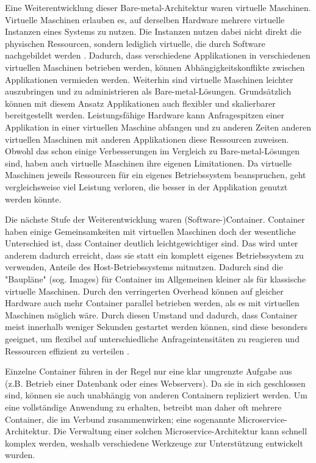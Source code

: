 \documentclass[11pt,a4paper]{article}
\begin{document}
Eine Weiterentwicklung dieser Bare-metal-Architektur waren virtuelle Maschinen. Virtuelle Maschinen erlauben es, auf derselben Hardware mehrere virtuelle Instanzen eines
Systems zu nutzen. Die Instanzen nutzen dabei nicht direkt die physischen Ressourcen, sondern lediglich virtuelle, die durch Software nachgebildet werden \cite{kofler2021docker}.
Dadurch, dass verschiedene Applikationen in verschiedenen virtuellen Maschinen betrieben werden, können Abhängigkeitskonflikte zwischen Applikationen
vermieden werden. Weiterhin sind virtuelle Maschinen leichter auszubringen und zu administrieren als Bare-metal-Lösungen.
Grundsätzlich können mit diesem Ansatz Applikationen auch flexibler und skalierbarer bereitgestellt werden.
Leistungsfähige Hardware kann Anfragespitzen einer Applikation in einer virtuellen Maschine abfangen und zu anderen Zeiten anderen virtuellen Maschinen mit anderen
Applikationen diese Ressourcen zuweisen.
Obwohl das schon einige Verbesserungen im Vergleich zu Bare-metal-Lösungen sind, haben auch virtuelle Maschinen ihre eigenen Limitationen.
Da virtuelle Maschinen jeweils Ressourcen für ein eigenes Betriebssystem beanspruchen, geht vergleichsweise viel Leistung verloren, 
die besser in der Applikation genutzt werden könnte.

Die nächste Stufe der Weiterentwicklung waren (Software-)Container. Container haben einige Gemeinsamkeiten mit virtuellen Maschinen doch der wesentliche Unterschied ist,
dass Container deutlich leichtgewichtiger sind. Das wird unter anderem dadurch erreicht, dass sie statt ein komplett eigenes Betriebssystem zu verwenden, 
Anteile des Host-Betriebssystems mitnutzen. Dadurch sind die "Baupläne" (sog. Images) für Container im Allgemeinen kleiner als für klassische virtuelle Maschinen.
Durch den verringerten Overhead können auf gleicher Hardware auch mehr Container parallel betrieben werden, als es mit virtuellen Maschinen möglich wäre.
Durch diesen Umstand und dadurch, dass Container meist innerhalb weniger Sekunden gestartet werden können, sind diese besonders geeignet,
um flexibel auf unterschiedliche Anfrageintensitäten zu reagieren und Ressourcen effizient zu verteilen \cite{kofler2021docker}.

Einzelne Container führen in der Regel nur eine klar umgrenzte Aufgabe aus (z.B. Betrieb einer Datenbank oder eines Webservers). Da sie in sich geschlossen sind,
können sie auch unabhängig von anderen Containern repliziert werden. Um eine vollständige Anwendung zu erhalten, betreibt man daher oft mehrere Container,
die im Verbund zusammenwirken; eine sogenannte Microservice-Architektur. Die Verwaltung einer solchen Microservice-Architektur kann schnell komplex werden,
weshalb verschiedene Werkzeuge zur Unterstützung entwickelt wurden.
\end{document}
